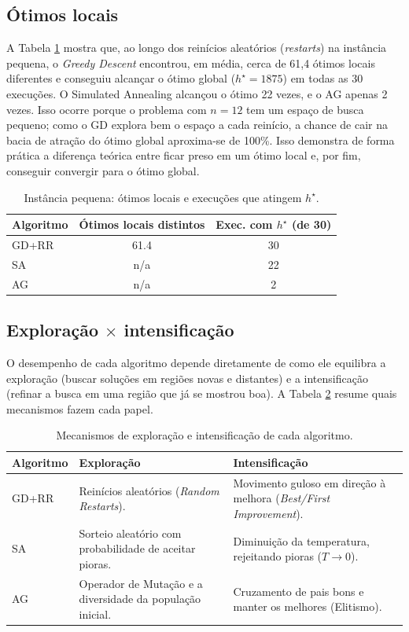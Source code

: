 \subsection{Ótimos locais}
\label{subsec:otimos-locais}

A Tabela \ref{tab:otimos-locais} mostra que, ao longo dos reinícios aleatórios (\textit{restarts}) na instância pequena, o \textit{Greedy Descent} encontrou, em média, cerca de 61,4 ótimos locais diferentes e conseguiu alcançar o ótimo global ($h^\star=1875$) em todas as 30 execuções. O Simulated Annealing alcançou o ótimo 22 vezes, e o AG apenas 2 vezes. Isso ocorre porque o problema com $n=12$ tem um espaço de busca pequeno; como o GD explora bem o espaço a cada reinício, a chance de cair na bacia de atração do ótimo global aproxima-se de 100\%. Isso demonstra de forma prática a diferença teórica entre ficar preso em um ótimo local e, por fim, conseguir convergir para o ótimo global.

\begin{table}[H]
\centering
\caption{Instância pequena: ótimos locais e execuções que atingem $h^\star$.}
\label{tab:otimos-locais}
\begin{tabular}{lcc}
\toprule
Algoritmo & Ótimos locais distintos & Exec. com $h^\star$ (de 30) \\
\midrule
GD+RR & 61.4 & 30 \\
SA & n/a & 22 \\
AG & n/a & 2 \\
\bottomrule
\end{tabular}
\end{table}

\subsection{Exploração $\times$ intensificação}
\label{subsec:exploracao}

O desempenho de cada algoritmo depende diretamente de como ele equilibra a exploração (buscar soluções em regiões novas e distantes) e a intensificação (refinar a busca em uma região que já se mostrou boa). A Tabela \ref{tab:exploracao} resume quais mecanismos fazem cada papel.

\begin{table}[H]
\centering
\caption{Mecanismos de exploração e intensificação de cada algoritmo.}
\label{tab:exploracao}
\begin{tabular}{@{}p{} p{} p{}@{}}
\toprule
Algoritmo & Exploração & Intensificação \\
\midrule
GD+RR     & Reinícios aleatórios (\textit{Random Restarts}). & Movimento guloso em direção à melhora (\textit{Best/First Improvement}). \\
SA        & Sorteio aleatório com probabilidade de aceitar pioras. & Diminuição da temperatura, rejeitando pioras ($T \to 0$). \\
AG        & Operador de Mutação e a diversidade da população inicial. & Cruzamento de pais bons e manter os melhores (Elitismo). \\
\bottomrule
\end{tabular}
\end{table}


